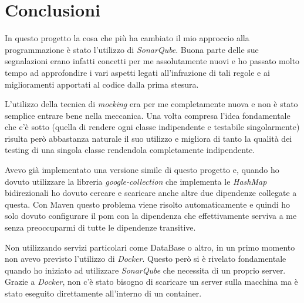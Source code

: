 \chapter{Conclusioni}
	In questo progetto la cosa che più ha cambiato il mio approccio alla programmazione è stato l'utilizzo di \emph{SonarQube}. Buona parte delle sue segnalazioni erano infatti concetti per me assolutamente nuovi e ho passato molto tempo ad approfondire i vari aspetti legati all'infrazione di tali regole e ai miglioramenti apportati al codice dalla prima stesura.
	
	L'utilizzo della tecnica di \emph{mocking} era per me completamente nuova e non è stato semplice entrare bene nella meccanica. Una volta compresa l'idea fondamentale che c'è sotto (quella di rendere ogni classe indipendente e testabile singolarmente) risulta però abbastanza naturale il suo utilizzo e migliora di tanto la qualità dei testing di una singola classe rendendola completamente indipendente.
	
	Avevo già implementato una versione simile di questo progetto e, quando ho dovuto utilizzare la libreria \emph{google-collection} che implementa le \emph{HashMap} bidirezionali ho dovuto cercare e scaricare anche altre due dipendenze collegate a questa. Con Maven questo problema viene risolto automaticamente e quindi ho solo dovuto configurare il pom con la dipendenza che effettivamente serviva a me senza preoccuparmi di tutte le dipendenze transitive.
	
	Non utilizzando servizi particolari come DataBase o altro, in un primo momento non avevo previsto l'utilizzo di \emph{Docker}. Questo però si è rivelato fondamentale quando ho iniziato ad utilizzare \emph{SonarQube} che necessita di un proprio server. Grazie a \emph{Docker}, non c'è stato bisogno di scaricare un server sulla macchina ma è stato eseguito direttamente all'interno di un container. 